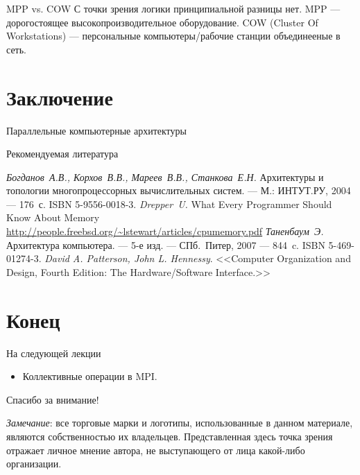\begin{frame}{MPP vs. COW}
\vfill
С точки зрения логики принципиальной разницы нет.
\vfill
MPP --- дорогостоящее высокопроизводительное оборудование.
\vfill
COW (Cluster Of Workstations) --- персональные компьютеры/рабочие станции
объединееные в сеть.
\end{frame}

\section{Заключение}

\begin{frame}{Параллельные компьютерные архитектуры}
\centering
{}
\end{frame}

\begin{frame}[allowframebreaks]{Рекомендуемая литература}
\begin{thebibliography}{99}
    \bibitem{} \textit{Богданов~А.В., Корхов~В.В., Мареев~В.В., Станкова~Е.Н.}
    Архитектуры и топологии многопроцессорных вычислительных систем. --- М.:
    ИНТУТ.РУ, 2004 --- 176~с. ISBN 5-9556-0018-3.
    \bibitem{} \textit{Drepper~U.} What Every Programmer Should Know About Memory
    \url{http://people.freebsd.org/~lstewart/articles/cpumemory.pdf}
    \bibitem{} \textit{Таненбаум~Э.} Архитектура компьютера. --- 5-е изд. --- СПб.~Питер, 2007 --- 844~c. ISBN 5-469-01274-3.
     \textit{David A. Patterson, John L. Hennessy}. <<Computer Organization and Design, Fourth Edition: The Hardware/Software Interface.>>
\end{thebibliography}
\end{frame}

\section*{Конец}

\begin{frame}{На следующей лекции}
\begin{itemize}
    \item Коллективные операции в MPI.
\end{itemize}
\end{frame}

\begin{frame}

{\huge{Спасибо за внимание!}\par}

\vfill

\tiny{\textit{Замечание}: все торговые марки и логотипы, использованные в данном материале, являются собственностью их владельцев. Представленная здесь точка зрения отражает личное мнение автора, не выступающего от лица какой-либо организации.}

\end{frame}


